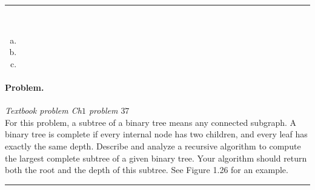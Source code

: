 \documentclass[11pt]{article}
\begin{document}
\hrule


\begin{solution}\

\begin{enumerate}[(a)]
    \item 
    \item 
    \item 
\end{enumerate}


\end{solution}




\paragraph{Problem.} \textit{Textbook problem Ch$1$ problem $37$} \\
\noindent For this problem, a subtree of a binary tree means any connected subgraph.
A binary tree is complete if every internal node has two children, and every
leaf has exactly the same depth. Describe and analyze a recursive algorithm
to compute the largest complete subtree of a given binary tree. Your algorithm
should return both the root and the depth of this subtree. See Figure 1.26 for an example.

\hrule

\begin{solution}



\end{solution}
\end{document}

